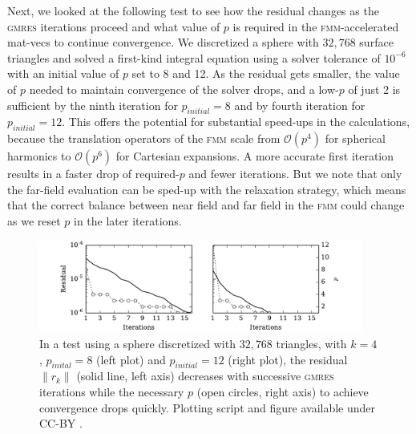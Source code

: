 \documentclass[final,3p,times]{elsarticle}
\newcommand{\fmm}{\textsc{fmm}\xspace}
\newcommand{\bigO}{\mathcal{O}}
\newcommand{\gmres}{\textsc{gmres}\xspace}
\begin{document}
Next, we looked at the following test to see how the residual changes as the \gmres iterations proceed and  what value of $p$ is required in the \fmm-accelerated mat-vecs to continue convergence. We discretized a sphere with $32,768$ surface triangles and solved a first-kind integral equation using a solver tolerance of $10^{-6}$ with an initial value of $p$ set to 8 and 12. As the residual gets smaller, the value of $p$ needed to maintain convergence of the solver drops, and a low-$p$ of just 2 is sufficient by the ninth iteration for $p_{initial}=8$ and by fourth iteration for $p_{initial}=12$. This offers the potential for substantial speed-ups in the calculations, because the translation operators of the \fmm scale from $\bigO(p^{4})$ for spherical harmonics to $\bigO(p^{6})$ for Cartesian expansions. A more accurate first iteration results in a faster drop of required-$p$ and fewer iterations. 
But we note that only the far-field evaluation can be sped-up with the relaxation strategy, which means that the correct balance between near field and far field in the \fmm could change as we reset $p$ in the later iterations.

\begin{figure}%
	\centering
	\includegraphics[natwidth=7in,natheight=2in,width=0.95\textwidth]{LaplaceResidualIterations.pdf}
	\caption{In a test using a sphere discretized with $32,768$ triangles, with $k=4$, $p_{inital}=8$ (left plot) and $p_{initial}=12$ (right plot), the residual $\|r_{k}\|$  (solid line, left axis) decreases with successive \gmres iterations while the necessary $p$ (open circles, right axis) to achieve convergence drops quickly. Plotting script and figure available under CC-BY \cite{WangLaytonBarba2016-figshare2}.}
	\label{fig:residualp}
\end{figure}
\end{document}

